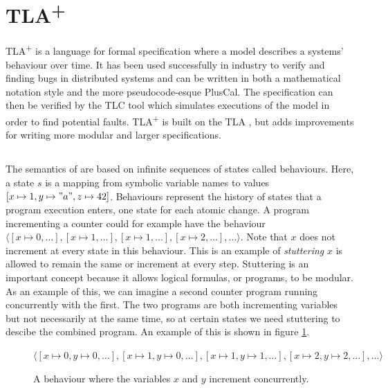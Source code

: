 \documentclass[english, biblatex, digitaloutput]{kththesis}
\begin{document}

\section{TLA\textsuperscript+}

TLA\textsuperscript+ \cite{lamport_specifying_2001} is a language for formal specification where a model describes a systems' behaviour over time. It has been used successfully in industry to verify and finding bugs in distributed systems \cite{joshi_checking_2003,newcombe_how_2015} and can be written in both a mathematical notation style and the more pseudocode-esque PlusCal. The specification can then be verified by the TLC tool which simulates executions of the model in order to find potential faults. TLA\textsuperscript+ is built on the \gls{TLA} \cite{lamport_temporal_1994}, but adds improvements for writing more modular and larger specifications.

\subsection{}
\label{subsec:tla}

The semantics of  are based on infinite sequences of states called behaviours. Here, a state $s$ is a mapping from symbolic variable names to values \eg $[x \mapsto 1, y \mapsto "a", z \mapsto 42]$. Behaviours represent the history of states that a program execution enters, one state for each atomic change. A program incrementing a counter could for example have the behaviour $\langle [x \mapsto 0, \dotsc], [x \mapsto 1, \dotsc], [x \mapsto 1, \dotsc], [x \mapsto 2, \dotsc], \dotsc \rangle$. Note that $x$ does not increment at every state in this behaviour. This is an example of \textit{stuttering} \ie $x$ is allowed to remain the same or increment at every step. Stuttering is an important concept because it allows logical formulas, or programs, to be modular. As an example of this, we can imagine a second counter program running concurrently with the first. The two programs are both incrementing variables but not necessarily at the same time, so at certain states we need stuttering to descibe the combined program. An example of this is shown in figure \ref{fig:concurrent-behaviour}.

\begin{figure}
	$\langle [x \mapsto 0, y \mapsto 0, \dotsc], [x \mapsto 1, y \mapsto 0, \dotsc], [x \mapsto 1, y \mapsto 1, \dotsc], [x \mapsto 2, y \mapsto 2, \dotsc], \dotsc \rangle$
	\caption{A behaviour where the variables $x$ and $y$ increment concurrently.}
	\label{fig:concurrent-behaviour}
\end{figure}
\end{document}
